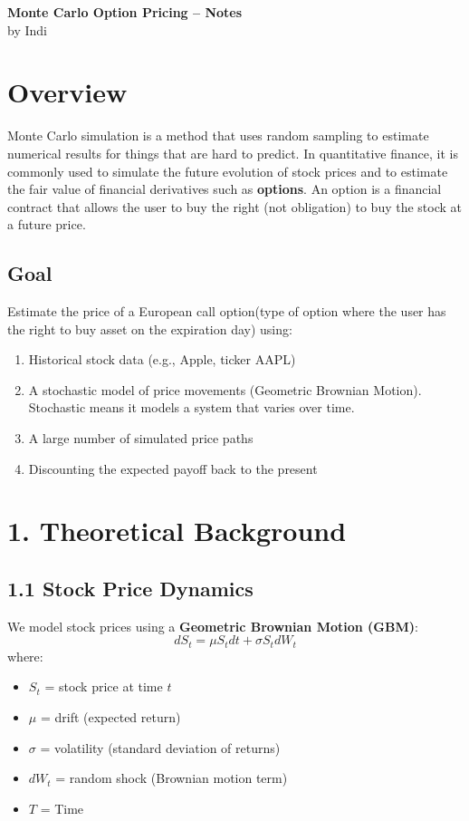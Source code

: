 \documentclass[12pt]{article}
\begin{document}
\begin{center}
    {\LARGE \textbf{Monte Carlo Option Pricing – Notes}} \\
    \vspace{0.5em}
    {\large by Indi}
\end{center}

\section{Overview}
Monte Carlo simulation is a method that uses random sampling to estimate numerical results for things that are hard to predict.
In quantitative finance, it is commonly used to simulate the future evolution of stock prices and to estimate the fair value of financial derivatives such as \textbf{options}. An option is a financial contract that allows the user to buy the right (not obligation) to buy the stock at a future price. 

\subsection*{Goal}
Estimate the price of a European call option(type of option where the user has the right to buy asset on the expiration day) using:
\begin{enumerate}
    \item Historical stock data (e.g., Apple, ticker AAPL)
    \item A stochastic model of price movements (Geometric Brownian Motion). Stochastic means it models a system that varies over time.
    \item A large number of simulated price paths
    \item Discounting the expected payoff back to the present
\end{enumerate}



\section{1. Theoretical Background}


\subsection{1.1 Stock Price Dynamics}
We model stock prices using a \textbf{Geometric Brownian Motion (GBM)}:
\[
dS_t = \mu S_t dt + \sigma S_t dW_t
\]
where:
\begin{itemize}
    \item $S_t$ = stock price at time $t$
    \item $\mu$ = drift (expected return)
    \item $\sigma$ = volatility (standard deviation of returns)
    \item $dW_t$ = random shock (Brownian motion term)
    \item $T$ = Time 
\end{itemize}
\end{document}
